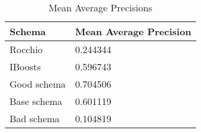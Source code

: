 \begingroup
    \renewcommand{\arraystretch}{2} %
    \begin{table}[]
        \centering
        \begin{tabular}{l | l }
            Schema & Mean Average Precision  \\
            \hline 
            Rocchio & 0.244344 \\
            IBoosts & 0.596743 \\
            Good schema & 0.704506 \\
            Base schema & 0.601119 \\
            Bad schema & 0.104819 \\
        \end{tabular}
        \caption{Mean Average Precisions}
        \label{tab:maps-2}
    \end{table}
\endgroup

